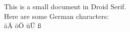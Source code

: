 \documentclass{article}
\begin{document}
This is a small document in Droid Serif.
\\
Here are some German characters:
\\
äÄ öÖ üÜ ß
\end{document}
